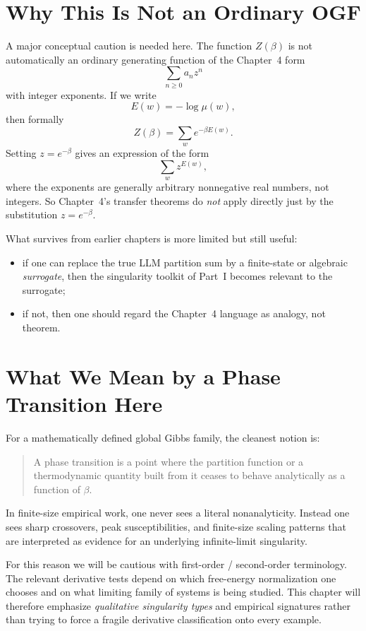 \section{Why This Is Not an Ordinary OGF}

A major conceptual caution is needed here. The function $Z(\beta)$ is not automatically an ordinary generating function of the Chapter~4 form
\[
  \sum_{n \ge 0} a_n z^n
\]
with integer exponents. If we write
\[
  E(w) = -\log \mu(w),
\]
then formally
\[
  Z(\beta) = \sum_w e^{-\beta E(w)}.
\]
Setting $z=e^{-\beta}$ gives an expression of the form
\[
  \sum_w z^{E(w)},
\]
where the exponents are generally arbitrary nonnegative real numbers, not integers. So Chapter~4's transfer theorems do \emph{not} apply directly just by the substitution $z=e^{-\beta}$.

What survives from earlier chapters is more limited but still useful:
\begin{itemize}
  \item if one can replace the true LLM partition sum by a finite-state or algebraic \emph{surrogate}, then the singularity toolkit of Part~I becomes relevant to the surrogate;
  \item if not, then one should regard the Chapter~4 language as analogy, not theorem.
\end{itemize}

\section{What We Mean by a Phase Transition Here}

For a mathematically defined global Gibbs family, the cleanest notion is:
\begin{quote}
A phase transition is a point where the partition function or a thermodynamic quantity built from it ceases to behave analytically as a function of $\beta$.
\end{quote}

In finite-size empirical work, one never sees a literal nonanalyticity. Instead one sees sharp crossovers, peak susceptibilities, and finite-size scaling patterns that are interpreted as evidence for an underlying infinite-limit singularity.

For this reason we will be cautious with first-order / second-order terminology. The relevant derivative tests depend on which free-energy normalization one chooses and on what limiting family of systems is being studied. This chapter will therefore emphasize \emph{qualitative singularity types} and empirical signatures rather than trying to force a fragile derivative classification onto every example.

